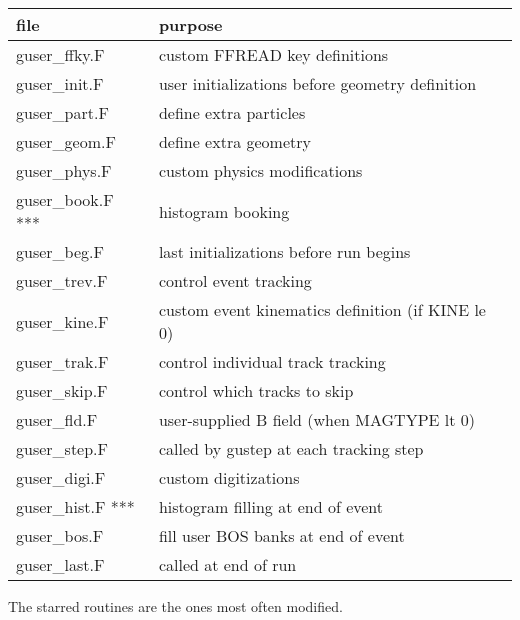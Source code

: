 \documentclass{article}
\begin{document}
\par
\begin{center}
\begin{tabular}{|l|l|} \hline
file          & purpose \\ \hline
guser\_ffky.F & custom FFREAD key definitions \\
guser\_init.F & user initializations before geometry definition \\
guser\_part.F & define extra particles \\
guser\_geom.F & define extra geometry \\
guser\_phys.F & custom physics modifications \\
guser\_book.F *** & histogram booking \\
guser\_beg.F  & last initializations before run begins \\
guser\_trev.F & control event tracking \\
guser\_kine.F & custom event kinematics definition (if KINE le 0) \\
guser\_trak.F & control individual track tracking \\
guser\_skip.F & control which tracks to skip \\
guser\_fld.F  & user-supplied B field (when MAGTYPE lt 0) \\
guser\_step.F & called by gustep at each tracking step \\
guser\_digi.F & custom digitizations \\
guser\_hist.F *** & histogram filling at end of event \\
guser\_bos.F  & fill user BOS banks at end of event \\
guser\_last.F & called at end of run \\ \hline
\end{tabular}
\end{center}
\par

The starred routines are the ones most often modified.
\end{document}
